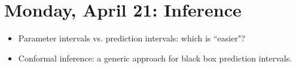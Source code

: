 \section{Monday, April 21: Inference}

\begin{itemize}
\item Parameter intervals vs. prediction intervals: which is ``easier"?
\item Conformal inference: a generic approach for black box prediction intervals. 
\end{itemize}


